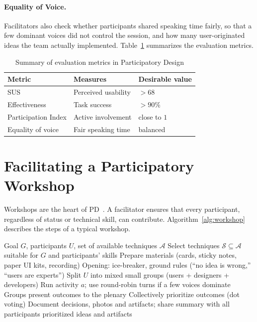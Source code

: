 \documentclass[a4paper,12pt]{article}
\begin{document}
\paragraph{Equality of Voice.} Facilitators also check whether participants shared speaking time fairly, so that a few dominant voices did not control the session, and how many user-originated ideas the team actually implemented. Table~\ref{tab:metrics} summarizes the evaluation metrics.

\begin{table}[H]
\centering
\begin{tabular}{@{}lll@{}}
\toprule
\rowcolor{myblue!20} \textbf{Metric} & \textbf{Measures} & \textbf{Desirable value} \\
\midrule
SUS                 & Perceived usability          & $> 68$ \\
Effectiveness       & Task success                 & $> 90\%$ \\
Participation Index & Active involvement           & close to $1$ \\
Equality of voice   & Fair speaking time           & balanced \\
\bottomrule
\end{tabular}
\caption{Summary of evaluation metrics in Participatory Design}
\label{tab:metrics}
\end{table}

\section{Facilitating a Participatory Workshop}
Workshops are the heart of PD~\cite{kensing1998,simonsen2012}. A facilitator ensures that every participant, regardless of status or technical skill, can contribute. Algorithm~\ref{alg:workshop} describes the steps of a typical workshop.

\begin{algorithm}[H]
\caption{Running a Participatory Design Workshop}
\label{alg:workshop}
\begin{algorithmic}[1]
\Require Goal $G$, participants $U$, set of available techniques $\mathcal{A}$
\State Select techniques $\mathcal{S} \subseteq \mathcal{A}$ suitable for $G$ and participants' skills
\State Prepare materials (cards, sticky notes, paper UI kits, recording)
\State Opening: ice-breaker, ground rules (``no idea is wrong,'' ``users are experts'')
    \State Split $U$ into mixed small groups (users + designers + developers)
    \State Run activity $a$; use round-robin turns if a few voices dominate
    \State Groups present outcomes to the plenary
\EndFor
\State Collectively prioritize outcomes (dot voting)
\State Document decisions, photos and artifacts; share summary with all participants
\State \Return prioritized ideas and artifacts
\end{algorithmic}
\end{algorithm}
\end{document}
